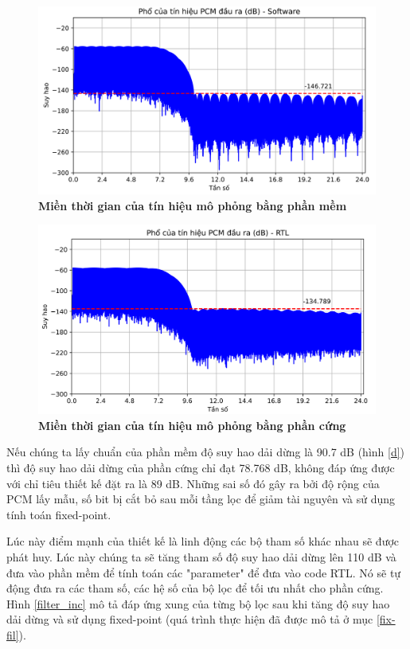\begin{figure}[H]
    \centering
    \includegraphics[width=12cm]{Images/Chuong4/tb/sim/sin_1_psd.png}
    \caption[Miền thời gian của tín hiệu mô phỏng bằng phần mềm]{\bfseries \fontsize{12pt}{0pt}\selectfont Miền thời gian của tín hiệu mô phỏng bằng phần mềm}
    \label{sin_1_psd}
\end{figure}

\begin{figure}[H]
    \centering
    \includegraphics[width=12cm]{Images/Chuong4/tb/sim/sin_1_psd_h.png}
    \caption[Miền thời gian của tín hiệu mô phỏng bằng phần cứng]{\bfseries \fontsize{12pt}{0pt}\selectfont Miền thời gian của tín hiệu mô phỏng bằng phần cứng}
    \label{sin_1_psd_h}
\end{figure}
Nếu chúng ta lấy chuẩn của phần mềm độ suy hao dải dừng là 90.7 dB (hình \ref{d}) thì độ suy hao dải dừng của phần cứng chỉ đạt 78.768 dB, không đáp ứng được với chỉ tiêu thiết kế đặt ra là 89 dB. Những sai số đó gây ra bởi độ rộng của PCM lấy mẫu, số bit bị cắt bỏ sau mỗi tầng lọc để giảm tài nguyên và sử dụng tính toán fixed-point.

Lúc này điểm mạnh của thiết kế là linh động các bộ tham số khác nhau sẽ được phát huy. Lúc này chúng ta sẽ tăng tham số độ suy hao dải dừng lên 110 dB và đưa vào phần mềm để tính toán các "parameter" để đưa vào code RTL. Nó sẽ tự động đưa ra các tham số, các hệ số của bộ lọc để tối ưu nhất cho phần cứng. Hình \ref{filter_inc} mô tả đáp ứng xung của từng bộ lọc sau khi tăng độ suy hao dải dừng và sử dụng fixed-point (quá trình thực hiện đã được mô tả ở mục \ref{fix-fil}).

